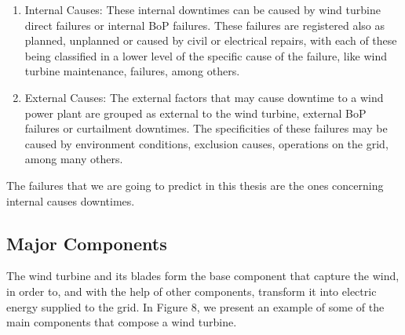 
\begin{enumerate}
    \item{Internal Causes:}
These internal downtimes can be caused by wind turbine direct failures or internal \gls{BoP} failures. These failures are registered also as planned, unplanned or caused by civil or electrical repairs, with each of these being classified in a lower level of the specific cause of the failure, like wind turbine maintenance, failures, among others.

    \item{External Causes:}
The external factors that may cause downtime to a wind power plant are grouped as external to the wind turbine, external \gls{BoP} failures or curtailment downtimes. The specificities of these failures may be caused by environment conditions, exclusion causes, operations on the grid, among many others.
\end{enumerate}

The failures that we are going to predict in this thesis are the ones concerning internal causes downtimes.



\subsection{Major Components} 
\label{sub:if_you_use_this_template} 

The wind turbine and its blades form the base component that capture the wind, in order to, and with the help of other components, transform it into electric energy supplied to the grid. In Figure 8, we present an example of some of the main components that compose a wind turbine.

